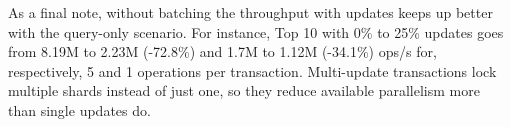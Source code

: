 \documentclass[sigplan,review,anonymous]{acmart}
\begin{document}

As a final note, without batching the throughput with updates keeps up better with the query-only scenario.
For instance, Top 10 with 0\% to 25\% updates goes from 8.19M to 2.23M (-72.8\%) and 1.7M to 1.12M (-34.1\%) ops/s for, respectively, 5 and 1 operations per transaction.
Multi-update transactions lock multiple shards instead of just one, so they reduce available parallelism more than single updates do.
\end{document}
